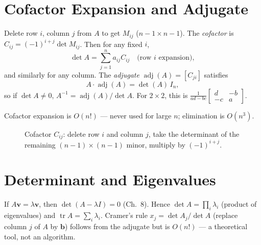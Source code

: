 \section{Cofactor Expansion and Adjugate}
\label{sec:cofactor}
Delete row $i$, column $j$ from $A$ to get $M_{ij}$ ($n-1\times n-1$). The \emph{cofactor} is $C_{ij}=(-1)^{i+j}\det M_{ij}$. Then for any fixed $i$,
\[
  \det A=\sum_{j=1}^{n} a_{ij}C_{ij}\quad\text{(row $i$ expansion)},
\]
and similarly for any column. The \emph{adjugate} $\operatorname{adj}(A)=[C_{ji}]$ satisfies
\[
  A\cdot\operatorname{adj}(A)=\det(A)\,I_n,
\]
so if $\det A\neq0$, $A^{-1}=\operatorname{adj}(A)/\det A$. For $2\times2$, this is $\frac1{ad-bc}\begin{bmatrix}d&-b\\-c&a\end{bmatrix}$.

Cofactor expansion is $O(n!)$ --- never used for large $n$; elimination is $O(n^3)$.

\begin{figure}[h]
\centering
{}
\caption{Cofactor $C_{ij}$: delete row $i$ and column $j$, take the determinant of the remaining $(n-1)\times(n-1)$ minor, multiply by $(-1)^{i+j}$.}
\label{fig:cofactor}
\end{figure}

\section{Determinant and Eigenvalues}
\label{sec:det-eigen-preview}
If $A\mathbf{v}=\lambda\mathbf{v}$, then $\det(A-\lambda I)=0$ (Ch.~8). Hence $\det A=\prod_i\lambda_i$ (product of eigenvalues) and $\operatorname{tr}A=\sum_i\lambda_i$. Cramer's rule $x_j=\det A_j/\det A$ (replace column $j$ of $A$ by $\mathbf{b}$) follows from the adjugate but is $O(n!)$ --- a theoretical tool, not an algorithm.

